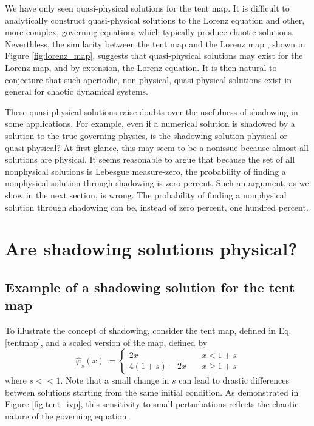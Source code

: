 We have only seen quasi-physical solutions for the tent map.
It is difficult to analytically construct quasi-physical solutions
to the Lorenz equation and other, more complex, governing
equations which typically produce chaotic solutions.  Neverthless, the similarity 
between the tent map and the Lorenz map \cite{tent2}, shown in Figure \ref{fig:lorenz_map}, suggests that
quasi-physical solutions may exist for the Lorenz map, and by
extension, the Lorenz equation.  It is then natural to conjecture
that such aperiodic, non-physical, quasi-physical solutions
exist in general for chaotic dynamical systems.

These quasi-physical solutions raise doubts over the usefulness of shadowing
in some applications.  For example, even if a numerical
solution is shadowed by a solution to the true governing physics,
is the shadowing solution physical or quasi-physical? At first glance, this may 
seem to be a nonissue because almost all solutions are physical. 
It seems reasonable to argue that because the set of
all nonphysical solutions is Lebesgue measure-zero, the probability of finding
a nonphysical solution through shadowing is zero percent.  Such an argument,
as we show in the next section, is wrong.  The probability of
finding a nonphysical solution through shadowing can be, instead of
zero percent, one hundred percent.

\section{Are shadowing solutions physical?}

\subsection{Example of a shadowing solution for the tent map}
\label{sec:sub:shadow-example}
To illustrate the concept of shadowing, consider the tent map, defined
in Eq. \ref{tentmap}, and a scaled version of the map, defined by
\begin{equation} \label{tent_scaled}
    \hat\varphi_s(x) := \begin{cases}
    2x \quad & x < 1+s \\
    4(1+s) - 2x \quad & x \ge 1+s
    \end{cases}
\end{equation}
where $s<<1$.  Note that a small change in $s$ can lead to drastic differences 
between solutions starting from the same initial condition.
As demonstrated in Figure \ref{fig:tent_ivp}, this sensitivity to small
perturbations reflects the chaotic nature of the governing equation.

